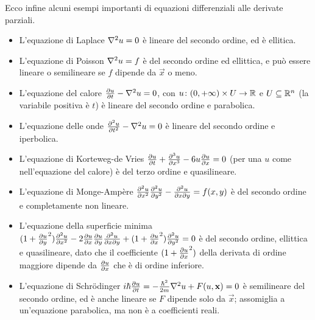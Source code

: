 Ecco infine alcuni esempi importanti di equazioni differenziali alle derivate parziali.
\begin{itemize}
    \item L'equazione di Laplace $\nabla^2 u=0$ è lineare del secondo ordine, ed è ellitica.  \item L'equazione di Poisson $\nabla^2 u=f$ è del secondo ordine ed ellittica, e può essere lineare o semilineare se $f$ dipende da $\vec x$ o meno.  \item L'equazione del calore $\frac{\partial {u}}{\partial {t}}-\nabla^2 u=0$, con $u\colon(0,+\infty)\times U\to\mathbb{R}$ e $U\subseteq\mathbb{R}^n$ (la variabile positiva è $t$) è lineare del secondo ordine e parabolica.  \item L'equazione delle onde $\frac{\partial^2 {u}}{\partial {t}^2}-\nabla^2 u=0$ è lineare del secondo ordine e iperbolica.
    \item L'equazione di Korteweg-de Vries $\frac{\partial {u}}{\partial {t}}+\frac{\partial^3u}{\partial x^3}-6u\frac{\partial {u}}{\partial {x}}=0$ (per una $u$ come nell'equazione del calore) è del terzo ordine e quasilineare.
    \item L'equazione di Monge-Ampère $\frac{\partial^2 {u}}{\partial {x}^2}\frac{\partial^2 {u}}{\partial {y}^2}-\frac{\partial^2 u}{\partial x\partial y}=f(x,y)$ è del secondo ordine e completamente non lineare.
    \item L'equazione della superficie minima $(1+\frac{\partial {u}}{\partial {y}}^2)\frac{\partial^2 {u}}{\partial {x}^2}-2\frac{\partial {u}}{\partial {x}}\frac{\partial {u}}{\partial {y}}\frac{\partial^2 u}{\partial x\partial y}+(1+\frac{\partial {u}}{\partial {x}}^2)\frac{\partial^2 {u}}{\partial {y}^2}=0$ è del secondo ordine, ellittica e quasilineare, dato che il coefficiente $(1+\frac{\partial {u}}{\partial {x}}^2)$ della derivata di ordine maggiore dipende da $\frac{\partial {u}}{\partial {x}}$ che è di ordine inferiore.
    \item L'equazione di Schrödinger $i\hbar\frac{\partial {u}}{\partial {t}}=-\frac{\hbar^2}{2m}\nabla^2 u+F(u,\mathbf{x})=0$ è semilineare del secondo ordine, ed è anche lineare se $F$ dipende solo da $\vec x$; assomiglia a un'equazione parabolica, ma non è a coefficienti reali.
\end{itemize}
